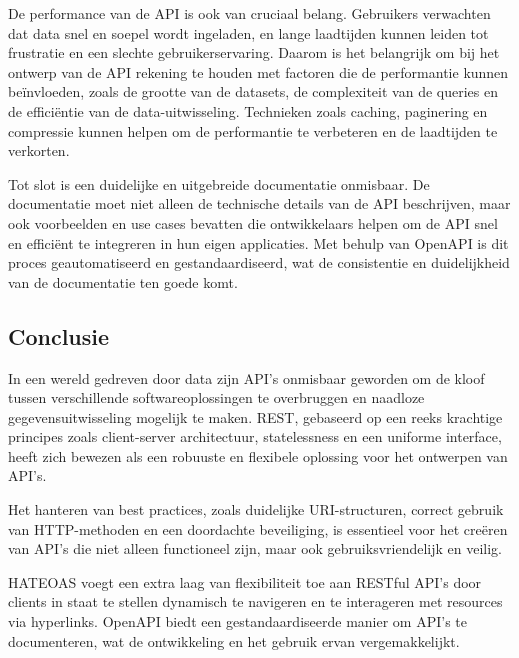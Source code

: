 \bigskip

De performance van de API is ook van cruciaal belang. Gebruikers verwachten dat data snel en soepel wordt ingeladen, en lange laadtijden kunnen leiden tot frustratie en een slechte gebruikerservaring. Daarom is het belangrijk om bij het ontwerp van de API rekening te houden met factoren die de performantie kunnen beïnvloeden, zoals de grootte van de datasets, de complexiteit van de queries en de efficiëntie van de data-uitwisseling. Technieken zoals caching, paginering en compressie kunnen helpen om de performantie te verbeteren en de laadtijden te verkorten.

\bigskip

Tot slot is een duidelijke en uitgebreide documentatie onmisbaar. De documentatie moet niet alleen de technische details van de API beschrijven, maar ook voorbeelden en use cases bevatten die ontwikkelaars helpen om de API snel en efficiënt te integreren in hun eigen applicaties. Met behulp van OpenAPI is dit proces geautomatiseerd en gestandaardiseerd, wat de consistentie en duidelijkheid van de documentatie ten goede komt.

\subsection{Conclusie}

In een wereld gedreven door data zijn API's onmisbaar geworden om de kloof tussen verschillende softwareoplossingen te overbruggen en naadloze gegevensuitwisseling mogelijk te maken. REST, gebaseerd op een reeks krachtige principes zoals client-server architectuur, statelessness en een uniforme interface, heeft zich bewezen als een robuuste en flexibele oplossing voor het ontwerpen van API's.

\bigskip

Het hanteren van best practices, zoals duidelijke URI-structuren, correct gebruik van HTTP-methoden en een doordachte beveiliging, is essentieel voor het creëren van API's die niet alleen functioneel zijn, maar ook gebruiksvriendelijk en veilig.

\bigskip

HATEOAS voegt een extra laag van flexibiliteit toe aan RESTful API's door clients in staat te stellen dynamisch te navigeren en te interageren met resources via hyperlinks. OpenAPI biedt een gestandaardiseerde manier om API's te documenteren, wat de ontwikkeling en het gebruik ervan vergemakkelijkt.

